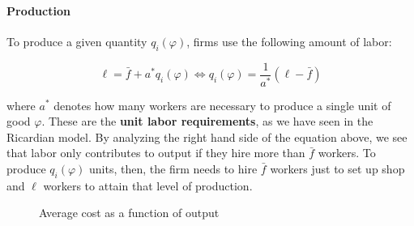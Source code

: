 \documentclass[11pt,letterpaper]{article}
\begin{document}
\paragraph{Production} To produce a given quantity $q_i(\varphi)$, firms use the following amount of labor:

\begin{equation*}
     \ell = \bar{f} + a^*q_i(\varphi) \iff q_i(\varphi) = \frac{1}{a^*} (\ell - \bar{f})
\end{equation*}

where $a^*$ denotes how many workers are necessary to produce a single unit of good $\varphi$. These are the \textbf{unit labor requirements}, as we have seen in the Ricardian model. By analyzing the right hand side of the equation above, we see that labor only contributes to output if they hire more than $\bar{f}$ workers. To produce $q_i(\varphi)$ units, then, the firm needs to hire $\bar{f}$ workers just to set up shop and $\ell$ workers to attain that level of production.


    \begin{figure}[htp]
        \centering
            \caption{Average cost as a function of output}
        \label{fig: ac}
    \end{figure}
\end{document}
